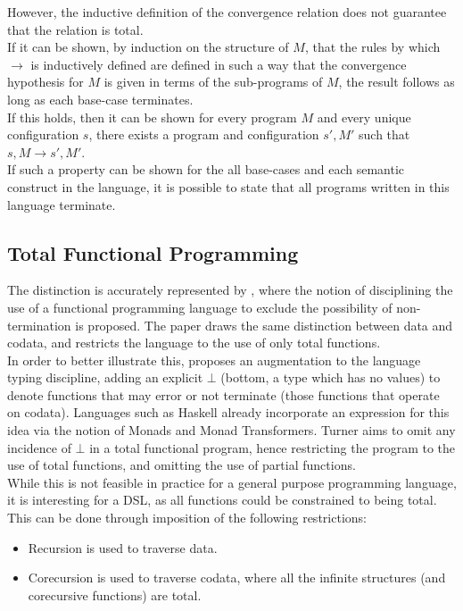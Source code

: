 However, the inductive definition of the convergence relation does not guarantee that the relation is total.\\

If it can be shown, by induction on the structure of $M$, that the rules by which $\rightarrow$ is inductively defined are defined in such a way that the convergence hypothesis for $M$ is given in terms of the sub-programs of $M$, the result follows as long as each base-case terminates. \\

If this holds, then it can be shown for every program $M$ and every unique configuration $s$, there exists a program and configuration $s', M'$ such that $s, M \rightarrow s', M'$.\\

If such a property can be shown for the all base-cases and each semantic construct in the language, it is possible to state that all programs written in this language terminate. 


\subsection{Total Functional Programming} %
\label{sub:total_functional_programming}
The distinction is accurately represented by \citet{turner2004total}, where the notion of disciplining the use of a functional programming language to exclude the possibility of non-termination is proposed. 
The paper draws the same distinction between data and codata, and restricts the language to the use of only total functions. \\

In order to better illustrate this, \citet{turner2004total} proposes an augmentation to the language typing discipline, adding an explicit $\bot$ (bottom, a type which has no values) to denote functions that may error or not terminate (those functions that operate on codata). 
Languages such as Haskell already incorporate an expression for this idea via the notion of Monads and Monad Transformers.
Turner aims to omit any incidence of $\bot$ in a total functional program, hence restricting the program to the use of total functions, and omitting the use of partial functions. \\

While this is not feasible in practice for a general purpose programming language, it is interesting for a DSL, as all functions could be constrained to being total.
This can be done through imposition of the following restrictions:
\begin{itemize}
    \item Recursion is used to traverse data.
    \item Corecursion is used to traverse codata, where all the infinite structures (and corecursive functions) are total. 
\end{itemize}

